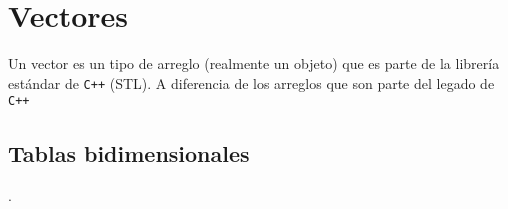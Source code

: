 \chapter{Vectores}

Un vector es un tipo de arreglo (realmente un objeto) que es parte de la librería estándar de \texttt{C++} (STL). A diferencia de los arreglos que son parte del legado de \texttt{C++}

\section{Tablas bidimensionales}

.
